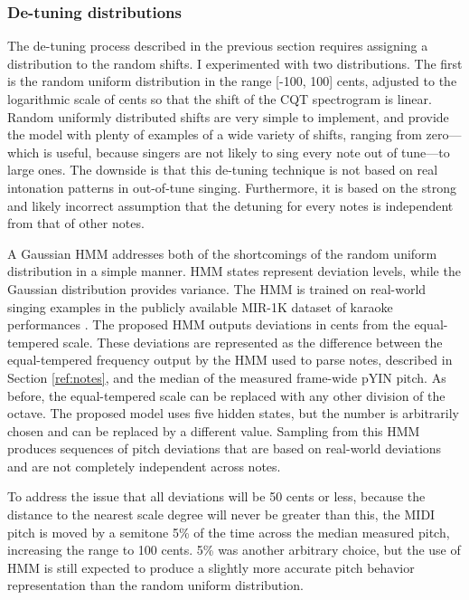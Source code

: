 \subsubsection{De-tuning distributions}
The de-tuning process described in the previous section requires assigning a distribution to the random shifts. I experimented with two distributions. The first is the random uniform distribution in the range [-100, 100] cents, adjusted to the logarithmic scale of cents so that the shift of the CQT spectrogram is linear. Random uniformly distributed shifts are very simple to implement, and provide the model with plenty of examples of a wide variety of shifts, ranging from zero---which is useful, because singers are not likely to sing every note out of tune---to large ones. The downside is that this de-tuning technique is not based on real intonation patterns in out-of-tune singing. Furthermore, it is based on the strong and likely incorrect assumption that the detuning for every notes is independent from that of other notes.

A Gaussian HMM addresses both of the shortcomings of the random uniform distribution in a simple manner. HMM states represent deviation levels, while the Gaussian distribution provides variance. The HMM is trained on real-world singing examples in the publicly available MIR-1K dataset of karaoke performances \cite{su2009improvement}. The proposed HMM outputs deviations in cents from the equal-tempered scale. These deviations are represented as the difference between the equal-tempered frequency output by the HMM used to parse notes, described in Section \ref{ref:notes}, and the median of the measured frame-wide pYIN pitch. As before, the equal-tempered scale can be replaced with any other division of the octave. The proposed model uses five hidden states, but the number is arbitrarily chosen and can be replaced by a different value.  Sampling from this HMM produces sequences of pitch deviations that are based on real-world deviations and are not completely independent across notes.

To address the issue that all deviations will be 50 cents or less, because the distance to the nearest scale degree will never be greater than this, the MIDI pitch is moved by a semitone 5\% of the time across the median measured pitch, increasing the range to 100 cents. 5\% was another arbitrary choice, but the use of HMM is still expected to produce a slightly more accurate pitch behavior representation than the random uniform distribution.

